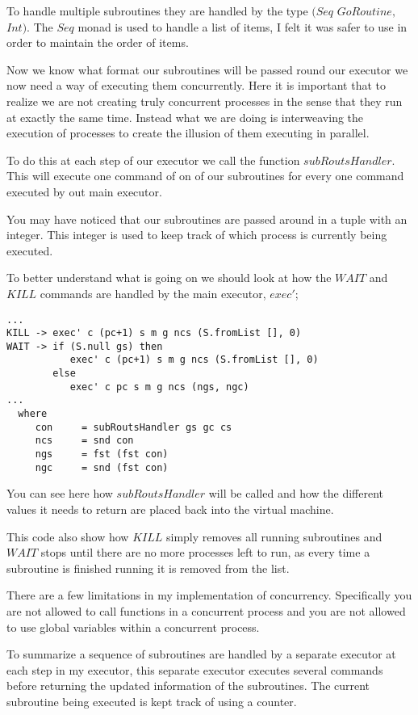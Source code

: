 To handle multiple subroutines they are handled by the type $(Seq$ $GoRoutine,$ $Int)$. The $Seq$ monad is used to handle a list of items, I felt it was safer to use in order to maintain the order of items. 

Now we know what format our subroutines will be passed round our executor we now need a way of executing them concurrently. Here it is important that to realize we are not creating truly concurrent processes in the sense that they run at exactly the same time. Instead what we are doing is interweaving the execution of processes to create the illusion of them executing in parallel. 

To do this at each step of our executor we call the function $subRoutsHandler$. This will execute one command of on of our subroutines for every one command executed by out main executor. 

You may have noticed that our subroutines are passed around in a tuple with an integer. This integer is used to keep track of which process is currently being executed. 

To better understand what is going on we should look at how the $WAIT$ and $KILL$ commands are handled by the main executor, $exec'$;

\begin{lstlisting}
...
KILL -> exec' c (pc+1) s m g ncs (S.fromList [], 0)
WAIT -> if (S.null gs) then
           exec' c (pc+1) s m g ncs (S.fromList [], 0)      
        else 
           exec' c pc s m g ncs (ngs, ngc)   
...
  where
     con     = subRoutsHandler gs gc cs
     ncs     = snd con
     ngs     = fst (fst con)
     ngc     = snd (fst con)
\end{lstlisting}    
 

You can see here how $subRoutsHandler$ will be called and how the different values it needs to return are placed back into the virtual machine. 

This code also show how $KILL$ simply removes all running subroutines and $WAIT$ stops until there are no more processes left to run, as every time a subroutine is finished running it is removed from the list.

There are a few limitations in my implementation of concurrency. Specifically you are  not allowed to call functions in a concurrent process and you are not allowed to use global variables within a concurrent process.

To summarize a sequence of subroutines are handled by a separate executor at each step in my executor, this separate executor executes several commands before returning the updated information of the subroutines. The current subroutine being executed is kept track of using a counter. 


